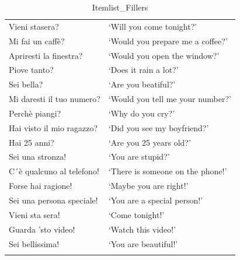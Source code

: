 \documentclass[output=paper]{langsci/langscibook}
\begin{document}
\begin{table}
\begin{tabularx}{\textwidth}{ll}
\lsptoprule
Vieni stasera? & `Will you come tonight?’                    \\
Mi fai un caffè? & `Would you prepare me a coffee?’          \\
Apriresti la finestra? & `Would you open the window?’        \\
Piove tanto? & `Does it rain a lot?’                          \\
Sei bella? & `Are you beatiful?’                             \\
Mi daresti il tuo numero? & `Would you tell me your number?’ \\
Perchè piangi? & `Why do you cry?’                           \\
Hai visto il mio ragazzo? & `Did you see my boyfriend?’     \\
Hai 25 anni? & `Are you 25 years old?’                       \\
Sei una stronza! & `You are stupid?’                         \\
C´è qualcuno al telefono! & `There is someone on the phone!’ \\
Forse hai ragione! & `Maybe you are right!’                  \\
Sei una persona speciale! & `You are a special person!’      \\
Vieni sta sera! & `Come tonight!’                            \\
Guarda 'sto video! & `Watch this video!’                     \\
Sei bellissima! & `You are beautiful!’          			\\            
\lspbottomrule
\end{tabularx}
\caption{Itemlist\_Fillers}
\label{tab:kel:2}
\end{table}
\end{document}
